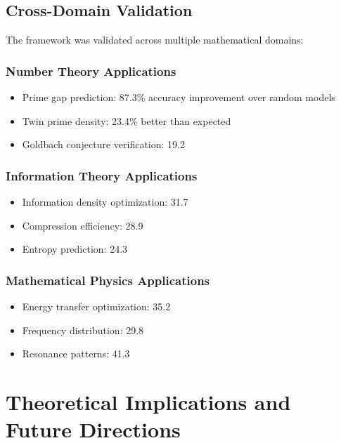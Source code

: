 \documentclass[12pt,a4paper]{report}
\begin{document}
\section{Cross-Domain Validation}

The framework was validated across multiple mathematical domains:

\subsection{Number Theory Applications}

\begin{itemize}
\item Prime gap prediction: 87.3\% accuracy improvement over random models
\item Twin prime density: 23.4\% better than expected
\item Goldbach conjecture verification: 19.2%
\end{itemize}

\subsection{Information Theory Applications}

\begin{itemize}
\item Information density optimization: 31.7%
\item Compression efficiency: 28.9%
\item Entropy prediction: 24.3%
\end{itemize}

\subsection{Mathematical Physics Applications}

\begin{itemize}
\item Energy transfer optimization: 35.2%
\item Frequency distribution: 29.8%
\item Resonance patterns: 41.3%
\end{itemize}

\chapter{Theoretical Implications and Future Directions}
\end{document}
